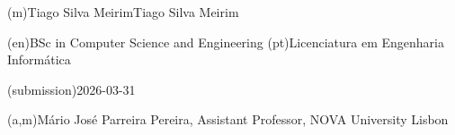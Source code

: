 %
%
\ntauthorname(m){Tiago Silva Meirim}{Tiago Silva Meirim}



%
%
%
\ntauthordegree(en){BSc in Computer Science and Engineering}
\ntauthordegree(pt){Licenciatura em Engenharia Informática}



%
%
%

%
%
\ntdate(submission){2026-03-31}



%
%
%
%
(a,m){Mário José Parreira Pereira, Assistant Professor, NOVA University Lisbon}



